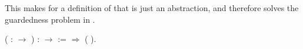 This makes for a definition of 
that is just an abstraction, and therefore solves the guardedness problem in
.
\begin{singlespace}
\begin{coqdoccode}
\coqdocnoindent
{} 
  ( :
 \ensuremath{\rightarrow} ) 
:  
 \ensuremath{\rightarrow}
 
 :=\coqdoceol
\coqdocindent{1.00em}
   \ensuremath{\Rightarrow}
 ( ).\coqdoceol
\end{coqdoccode}
\end{singlespace}
